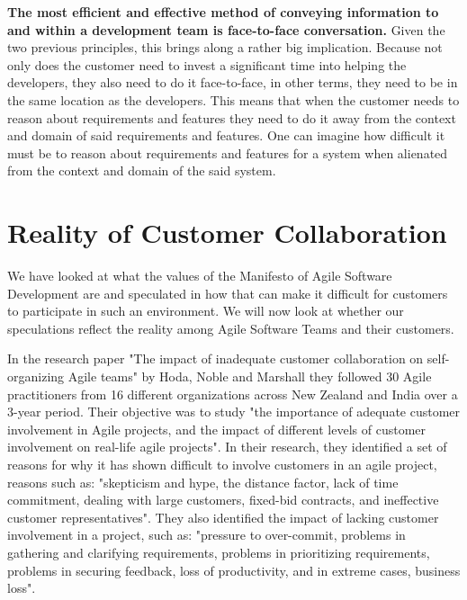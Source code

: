 \textbf{The most efficient and effective method of conveying information to and within a development team is face-to-face conversation.}
Given the two previous principles, this brings along a rather big implication.
Because not only does the customer need to invest a significant time into helping the developers, they also need to do it face-to-face, in other terms, they need to be in the same location as the developers.
This means that when the customer needs to reason about requirements and features they need to do it away from the context and domain of said requirements and features.
One can imagine how difficult it must be to reason about requirements and features for a system when alienated from the context and domain of the said system. 

\section{Reality of Customer Collaboration}
We have looked at what the values of the Manifesto of Agile Software Development are and speculated in how that can make it difficult for customers to participate in such an environment.
We will now look at whether our speculations reflect the reality among Agile Software Teams and their customers.

In the research paper "The impact of inadequate customer collaboration on self-organizing Agile teams" by Hoda, Noble and Marshall \cite{Hoda2011TheIO} they followed 30 Agile practitioners from 16 different organizations across New Zealand and India over a 3-year period.
Their objective was to study "the importance of adequate customer involvement in Agile projects, and the impact of different levels of customer involvement on real-life agile projects".
In their research, they identified a set of reasons for why it has shown difficult to involve customers in an agile project, reasons such as: "skepticism and hype, the distance factor, lack of time commitment, dealing with large customers, fixed-bid contracts, and ineffective customer representatives".
They also identified the impact of lacking customer involvement in a project, such as: "pressure to over-commit, problems in gathering and clarifying requirements, problems in prioritizing requirements, problems in securing feedback, loss of productivity, and in extreme cases, business loss". \cite{Hoda2011TheIO}

